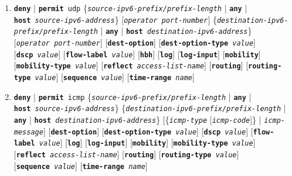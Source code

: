\begin{frame}[allowframebreaks]
\begin{enumerate}
    [\texttt{\textbf{mobility-type}~\textit{value}}]
    [\texttt{\textbf{psh}}]
    [\texttt{\textbf{reflect}~\textit{access-list-name}}]
    [\texttt{\textbf{routing}}]
    [\texttt{\textbf{routing-type}~\textit{value}}]
    [\texttt{\textbf{rst}}]
    [\texttt{\textbf{sequence}~\textit{value}}]
    [\texttt{\textbf{syn}}]
    [\texttt{\textbf{time-range}~\textit{name}}]
    [\texttt{\textbf{urg}}]
  \item \texttt{\textbf{deny}} | \texttt{\textbf{permit} udp}
    \{\texttt{\textit{source-ipv6-prefix/prefix-length}} |
    \texttt{\textbf{any}} |
    \texttt{\textbf{host}~\textit{source-ipv6-address}}\}
    [\texttt{\textit{operator~port-number}}]
    \{\texttt{\textit{destination-ipv6-prefix/prefix-length}} |
    \texttt{\textbf{any}} |
    \texttt{\textbf{host}~\textit{destination-ipv6-address}}\}
    [\texttt{\textit{operator~port-number}}]
    [\texttt{\textbf{dest-option}}]
    [\texttt{\textbf{dest-option-type}~\textit{value}}]
    [\texttt{\textbf{dscp}~\textit{value}}]
    [\texttt{\textbf{flow-label}~\textit{value}}]
    [\texttt{\textbf{hbh}}]
    [\texttt{\textbf{log}}]
    [\texttt{\textbf{log-input}}]
    [\texttt{\textbf{mobility}}]
    [\texttt{\textbf{mobility-type}~\textit{value}}]
    [\texttt{\textbf{reflect}~\textit{access-list-name}}]
    [\texttt{\textbf{routing}}]
    [\texttt{\textbf{routing-type}~\textit{value}}]
    [\texttt{\textbf{sequence}~\textit{value}}]
    [\texttt{\textbf{time-range}~\textit{name}}]
  \item \texttt{\textbf{deny}} | \texttt{\textbf{permit} icmp}
    \{\texttt{\textit{source-ipv6-prefix/prefix-length}} |
    \texttt{\textbf{any}} |
    \texttt{\textbf{host}~\textit{source-ipv6-address}}\}
    \{\texttt{\textit{destination-ipv6-prefix/prefix-length}} |
    \texttt{\textbf{any}} |
    \texttt{\textbf{host}~\textit{destination-ipv6-address}}\}
    [\{\texttt{\textit{icmp-type}} [\texttt{\textit{icmp-code}}]\} | \texttt{\textit{icmp-message}}]
    [\texttt{\textbf{dest-option}}]
    [\texttt{\textbf{dest-option-type}~\textit{value}}]
    [\texttt{\textbf{dscp}~\textit{value}}]
    [\texttt{\textbf{flow-label}~\textit{value}}]
    [\texttt{\textbf{log}}]
    [\texttt{\textbf{log-input}}]
    [\texttt{\textbf{mobility}}]
    [\texttt{\textbf{mobility-type}~\textit{value}}]
    [\texttt{\textbf{reflect}~\textit{access-list-name}}]
    [\texttt{\textbf{routing}}]
    [\texttt{\textbf{routing-type}~\textit{value}}]
    [\texttt{\textbf{sequence}~\textit{value}}]
    [\texttt{\textbf{time-range}~\textit{name}}]

\end{enumerate}
\end{frame}
